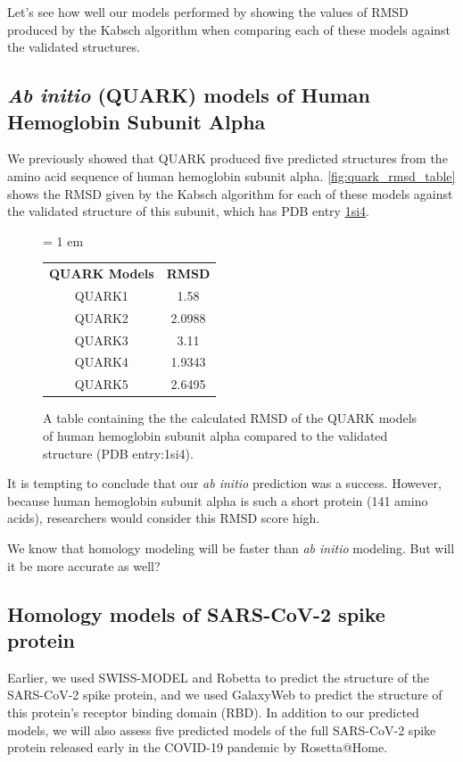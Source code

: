 Let's see how well our models performed by showing the values of RMSD produced by the Kabsch algorithm when comparing each of these models against the validated structures.

\FloatBarrier
{}
\subsection{\textit{Ab initio} (QUARK) models of Human Hemoglobin Subunit Alpha}

We previously showed that QUARK produced five predicted structures from the amino acid sequence of human hemoglobin subunit alpha. \autoref{fig:quark_rmsd_table} shows the RMSD given by the Kabsch algorithm for each of these models against the validated structure of this subunit, which has PDB entry \href{https://www.rcsb.org/structure/1si4}{1si4}.\\

\begin{figure}[h]
	\centering
	\tabcolsep = 1 em
	\mySfFamily
	\begin{tabular}{c c}
		\textbf{QUARK Models} & \textbf{RMSD} \\
		QUARK1 & 1.58 \\
		QUARK2 & 2.0988 \\
		QUARK3 & 3.11 \\
		QUARK4 & 1.9343 \\
		QUARK5 & 2.6495 \\
	\end{tabular}
	\caption{A table containing the the calculated RMSD of the QUARK models of human hemoglobin subunit alpha compared to the validated structure (PDB entry:1si4).}
	\label{fig:quark_rmsd_table}
\end{figure}

It is tempting to conclude that our \textit{ab initio} prediction was a success. However, because human hemoglobin subunit alpha is such a short protein (141 amino acids), researchers would consider this RMSD score high.

We know that homology modeling will be faster than \textit{ab initio} modeling. But will it be more accurate as well?

\FloatBarrier
{}
\subsection{Homology models of SARS-CoV-2 spike protein}

Earlier, we used SWISS-MODEL and Robetta to predict the structure of the SARS-CoV-2 spike protein, and we used GalaxyWeb to predict the structure of this protein's receptor binding domain (RBD). In addition to our predicted models, we will also assess five predicted models of the full SARS-CoV-2 spike protein released early in the COVID-19 pandemic by Rosetta@Home.


